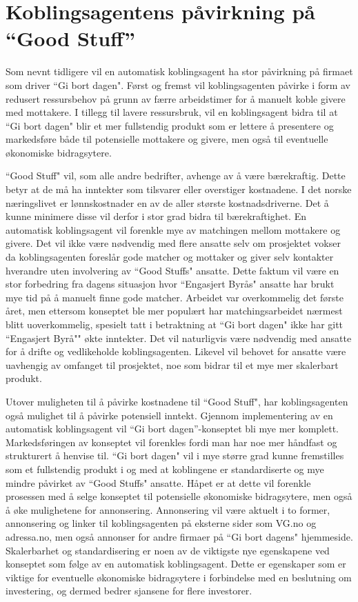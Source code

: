 \section{Koblingsagentens påvirkning på ``Good Stuff''}
\label{sec:koblingsagent}
Som nevnt tidligere vil en automatisk koblingsagent ha stor påvirkning på firmaet som driver ``Gi bort dagen". Først og fremst vil koblingsagenten påvirke i form av redusert ressursbehov på grunn av færre arbeidstimer for å manuelt koble givere med mottakere. I tillegg til lavere ressursbruk, vil en koblingsagent bidra til at ``Gi bort dagen" blir et mer fullstendig produkt som er lettere å presentere og markedsføre både til potensielle mottakere og givere, men også til eventuelle økonomiske bidragsytere.

``Good Stuff" vil, som alle andre bedrifter, avhenge av å være bærekraftig. Dette betyr at de må ha inntekter som tilsvarer eller overstiger kostnadene. I det norske næringslivet er lønnskostnader en av de aller største kostnadsdriverne. Det å kunne minimere disse vil derfor i stor grad bidra til bærekraftighet. En automatisk koblingsagent vil forenkle mye av matchingen mellom mottakere og givere. Det vil ikke være nødvendig med flere ansatte selv om prosjektet vokser da koblingsagenten foreslår gode matcher og mottaker og giver selv kontakter hverandre uten involvering av ``Good Stuffs" ansatte. Dette faktum vil være en stor forbedring fra dagens situasjon hvor ``Engasjert Byrås" ansatte har brukt mye tid på å manuelt finne gode matcher. Arbeidet var overkommelig det første året, men ettersom konseptet ble mer populært har matchingsarbeidet nærmest blitt uoverkommelig, spesielt tatt i betraktning at ``Gi bort dagen" ikke har gitt ``Engasjert Byrå"" økte inntekter. Det vil naturligvis være nødvendig med ansatte for å drifte og vedlikeholde koblingsagenten. Likevel vil behovet for ansatte være uavhengig av omfanget til prosjektet, noe som bidrar til et mye mer skalerbart produkt.

Utover muligheten til å påvirke kostnadene til ``Good Stuff", har koblingsagenten også mulighet til å påvirke potensiell inntekt. Gjennom implementering av en automatisk koblingsagent vil “Gi bort dagen”-konseptet bli mye mer komplett. Markedsføringen av konseptet vil forenkles fordi man har noe mer håndfast og strukturert å henvise til. ``Gi bort dagen" vil i mye større grad kunne fremstilles som et fullstendig produkt i og med at koblingene er standardiserte og mye mindre påvirket av ``Good Stuffs" ansatte. Håpet er at dette vil forenkle prosessen med å selge konseptet til potensielle økonomiske bidragsytere, men også å øke mulighetene for annonsering. Annonsering vil være aktuelt i to former, annonsering og linker til koblingsagenten på eksterne sider som VG.no og adressa.no, men også annonser for andre firmaer på ``Gi bort dagens" hjemmeside. Skalerbarhet og standardisering er noen av de viktigste nye egenskapene ved konseptet som følge av en automatisk koblingsagent. Dette er egenskaper som er viktige for eventuelle økonomiske bidragsytere i forbindelse med en beslutning om investering, og dermed bedrer sjansene for flere investorer.


